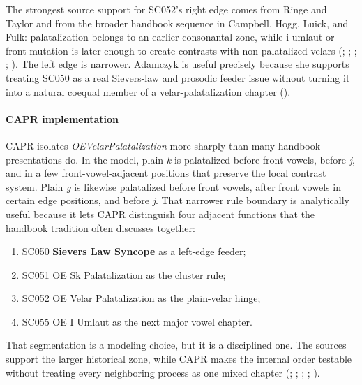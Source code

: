 \documentclass[
  british,
  a4paper,
]{article}
\providecommand{\tightlist}{%
  \setlength{\itemsep}{0pt}\setlength{\parskip}{0pt}}
\begin{document}
The strongest source support for SC052's right edge comes from Ringe and
Taylor and from the broader handbook sequence in Campbell, Hogg, Luick,
and Fulk: palatalization belongs to an earlier consonantal zone, while
i-umlaut or front mutation is later enough to create contrasts with
non-palatalized velars (; ;
; ; ). The left edge
is narrower. Adamczyk is useful precisely because she supports treating
SC050 as a real Sievers-law and prosodic feeder issue without turning it
into a natural coequal member of a velar-palatalization chapter
().

\paragraph{CAPR implementation}\label{capr-implementation-32}

CAPR isolates \emph{OEVelarPalatalization} more sharply than many
handbook presentations do. In the model, plain \emph{k} is palatalized
before front vowels, before \emph{j}, and in a few front-vowel-adjacent
positions that preserve the local contrast system. Plain \emph{g} is
likewise palatalized before front vowels, after front vowels in certain
edge positions, and before \emph{j}. That narrower rule boundary is
analytically useful because it lets CAPR distinguish four adjacent
functions that the handbook tradition often discusses together:

\begin{enumerate}
\def\labelenumi{\arabic{enumi}.}
\tightlist
\item
  SC050 \textbf{Sievers Law Syncope} as a left-edge feeder;
\item
  SC051 OE Sk Palatalization as the cluster rule;
\item
  SC052 OE Velar Palatalization as the plain-velar hinge;
\item
  SC055 OE I Umlaut as the next major vowel chapter.
\end{enumerate}

That segmentation is a modeling choice, but it is a disciplined one. The
sources support the larger historical zone, while CAPR makes the
internal order testable without treating every neighboring process as
one mixed chapter (; ;
; ; ).
\end{document}
